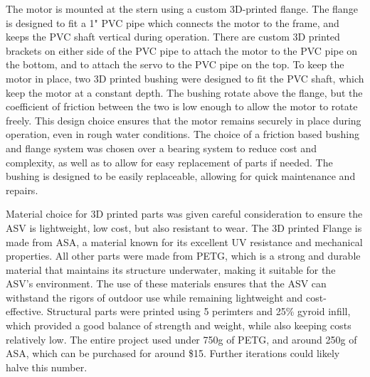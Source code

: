 The motor is mounted at the stern using a custom 3D-printed flange. The flange is designed to fit a 1" PVC pipe which connects the motor to the frame, and keeps the PVC shaft vertical during operation. There are custom 3D printed brackets on either side of the PVC pipe to attach the motor to the PVC pipe on the bottom, and to attach the servo to the PVC pipe on the top. To keep the motor in place, two 3D printed bushing were designed to fit the PVC shaft, which keep the motor at a constant depth. The bushing rotate above the flange, but the coefficient of friction between the two is low enough to allow the motor to rotate freely. This design choice ensures that the motor remains securely in place during operation, even in rough water conditions. The choice of a friction based bushing and flange system was chosen over a bearing system to reduce cost and complexity, as well as to allow for easy replacement of parts if needed. The bushing is designed to be easily replaceable, allowing for quick maintenance and repairs.

Material choice for 3D printed parts was given careful consideration to ensure the ASV is lightweight, low cost, but also resistant to wear. The 3D printed Flange is made from ASA, a material known for its excellent UV resistance and mechanical properties. All other parts were made from PETG, which is a strong and durable material that maintains its structure underwater, making it suitable for the ASV's environment. The use of these materials ensures that the ASV can withstand the rigors of outdoor use while remaining lightweight and cost-effective. Structural parts were printed using 5 perimters and 25\% gyroid infill, which provided a good balance of strength and weight, while also keeping costs relatively low. The entire project used under 750g of PETG, and around 250g of ASA, which can be purchased for around \$15. Further iterations could likely halve this number.